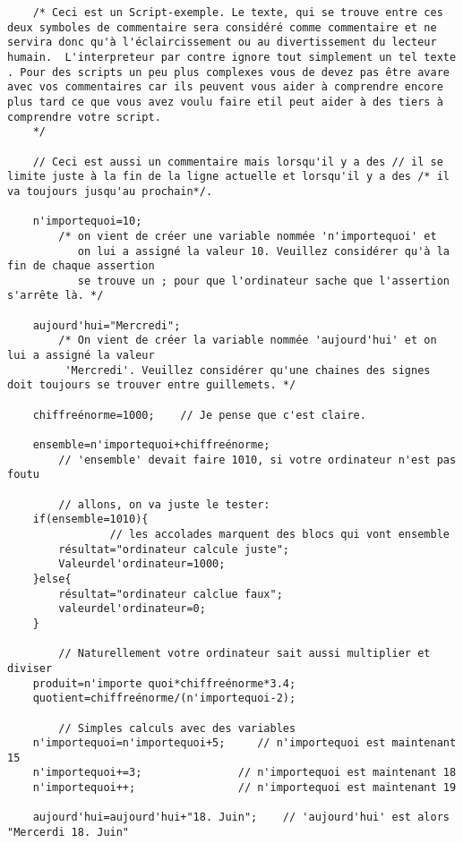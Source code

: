 \documentclass[a4paper]{scrartcl}
\begin{document}
\begin{verbatim}
    /* Ceci est un Script-exemple. Le texte, qui se trouve entre ces deux symboles de commentaire sera considéré comme commentaire et ne servira donc qu'à l'éclaircissement ou au divertissement du lecteur humain.  L'interpreteur par contre ignore tout simplement un tel texte . Pour des scripts un peu plus complexes vous de devez pas être avare avec vos commentaires car ils peuvent vous aider à comprendre encore plus tard ce que vous avez voulu faire etil peut aider à des tiers à comprendre votre script.
    */

    // Ceci est aussi un commentaire mais lorsqu'il y a des // il se limite juste à la fin de la ligne actuelle et lorsqu'il y a des /* il va toujours jusqu'au prochain*/.

    n'importequoi=10;
        /* on vient de créer une variable nommée 'n'importequoi' et
           on lui a assigné la valeur 10. Veuillez considérer qu'à la fin de chaque assertion
           se trouve un ; pour que l'ordinateur sache que l'assertion s'arrête là. */

    aujourd'hui="Mercredi";
        /* On vient de créer la variable nommée 'aujourd'hui' et on lui a assigné la valeur
         'Mercredi'. Veuillez considérer qu'une chaines des signes doit toujours se trouver entre guillemets. */

    chiffreénorme=1000;    // Je pense que c'est claire.

    ensemble=n'importequoi+chiffreénorme;
        // 'ensemble' devait faire 1010, si votre ordinateur n'est pas foutu

        // allons, on va juste le tester:
    if(ensemble=1010){
                // les accolades marquent des blocs qui vont ensemble
        résultat="ordinateur calcule juste";
        Valeurdel'ordinateur=1000;
    }else{
        résultat="ordinateur calclue faux";
        valeurdel'ordinateur=0;
    }

        // Naturellement votre ordinateur sait aussi multiplier et diviser
    produit=n'importe quoi*chiffreénorme*3.4;
    quotient=chiffreénorme/(n'importequoi-2);

        // Simples calculs avec des variables
    n'importequoi=n'importequoi+5;     // n'importequoi est maintenant 15
    n'importequoi+=3;               // n'importequoi est maintenant 18
    n'importequoi++;                // n'importequoi est maintenant 19

    aujourd'hui=aujourd'hui+"18. Juin";    // 'aujourd'hui' est alors "Mercerdi 18. Juin"


\end{verbatim}
\end{document}
